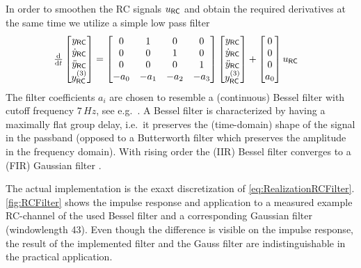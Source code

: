 In order to smoothen the RC signals $\uRC$ and obtain the required derivatives at the same time we utilize a simple low pass filter
\begin{align}\label{eq:RealizationRCFilter}
 \tdiff{t} \begin{bmatrix} \yRC[] \\ \yRCd[] \\ \yRCdd[] \\ \yRCddd[] \end{bmatrix}
 &= \begin{bmatrix} 0 & 1 & 0 & 0 \\ 0 & 0 & 1 & 0 \\ 0 & 0 & 0 & 1 \\ -a_0 & -a_1 & -a_2 & -a_3 \end{bmatrix}
 \begin{bmatrix} \yRC[] \\ \yRCd[] \\ \yRCdd[] \\ \yRCddd[] \end{bmatrix}
 + \begin{bmatrix} 0 \\ 0 \\ 0 \\ a_0 \end{bmatrix}
 \uRC[]
\end{align}
The filter coefficients $a_i$ are chosen to resemble a (continuous) Bessel filter with cutoff frequency $7\,\unit{Hz}$, see e.g.\ \cite[sec.\,13.1.3]{TietzeSchenk:Halbleiter-Schaltungstechnik}.
A Bessel filter is characterized by having a maximally flat group delay, i.e.\ it preserves the (time-domain) shape of the signal in the passband (opposed to a Butterworth filter which preserves the amplitude in the frequency domain).
With rising order the (IIR) Bessel filter converges to a (FIR) Gaussian filter \cite[sec.\ 4.9.2]{Rabiner:DSP}.

The actual implementation is the exaxt discretization of \eqref{eq:RealizationRCFilter}.
\autoref{fig:RCFilter} shows the impulse response and application to a measured example RC-channel of the used Bessel filter and a corresponding Gaussian filter (windowlength 43).
Even though the difference is visible on the impulse response, the result of the implemented filter and the Gauss filter are indistinguishable in the practical application.

